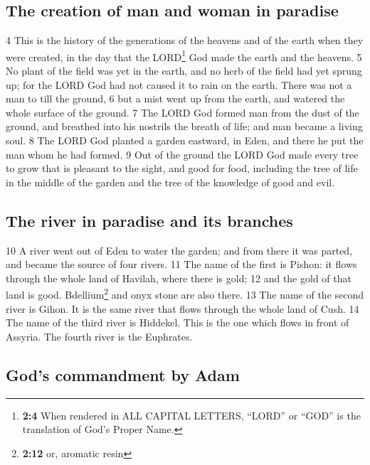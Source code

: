 \hypertarget{the-creation-of-man-and-woman-in-paradise}{%
\subsection{The creation of man and woman in
paradise}\label{the-creation-of-man-and-woman-in-paradise}}

{4} This is the history of the generations of the heavens and of the
earth when they were created, in the day that the LORD\footnote{\textbf{2:4}
  When rendered in ALL CAPITAL LETTERS, ``LORD'' or ``GOD'' is the
  translation of God's Proper Name.} God made the earth and the heavens.
{5} No plant of the field was yet in the earth, and no herb of the field
had yet sprung up; for the LORD God had not caused it to rain on the
earth. There was not a man to till the ground, {6} but a mist went up
from the earth, and watered the whole surface of the ground. {7} The
LORD God formed man from the dust of the ground, and breathed into his
nostrils the breath of life; and man became a living soul. {8} The LORD
God planted a garden eastward, in Eden, and there he put the man whom he
had formed. {9} Out of the ground the LORD God made every tree to grow
that is pleasant to the sight, and good for food, including the tree of
life in the middle of the garden and the tree of the knowledge of good
and evil.

\hypertarget{the-river-in-paradise-and-its-branches}{%
\subsection{The river in paradise and its
branches}\label{the-river-in-paradise-and-its-branches}}

{10} A river went out of Eden to water the garden; and from there it was
parted, and became the source of four rivers. {11} The name of the first
is Pishon: it flows through the whole land of Havilah, where there is
gold; {12} and the gold of that land is good. Bdellium\footnote{\textbf{2:12}
  or, aromatic resin} and onyx stone are also there. {13} The name of
the second river is Gihon. It is the same river that flows through the
whole land of Cush. {14} The name of the third river is Hiddekel. This
is the one which flows in front of Assyria. The fourth river is the
Euphrates.

\hypertarget{gods-commandment-by-adam}{%
\subsection{God's commandment by Adam}\label{gods-commandment-by-adam}}

